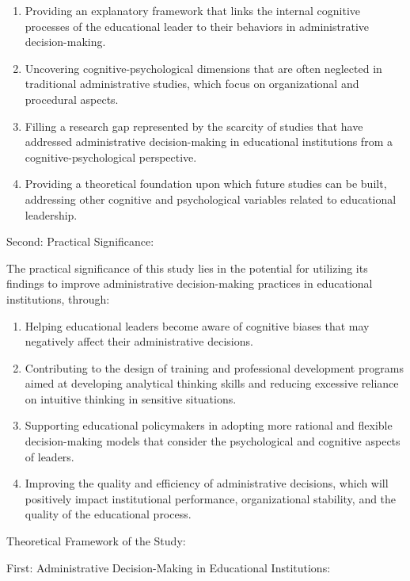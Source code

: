 \documentclass[10pt]{NSP1}
\begin{document}
\begin{enumerate}
  \item Providing an explanatory framework that links the internal cognitive processes of the educational leader to their behaviors in administrative decision-making.
  \item Uncovering cognitive-psychological dimensions that are often neglected in traditional administrative studies, which focus on organizational and procedural aspects.
  \item Filling a research gap represented by the scarcity of studies that have addressed administrative decision-making in educational institutions from a cognitive-psychological perspective.
  \item Providing a theoretical foundation upon which future studies can be built, addressing other cognitive and psychological variables related to educational leadership.
\end{enumerate}

Second: Practical Significance:

The practical significance of this study lies in the potential for utilizing its findings to improve administrative decision-making practices in educational institutions, through:

\begin{enumerate}
  \item Helping educational leaders become aware of cognitive biases that may negatively affect their administrative decisions.
  \item Contributing to the design of training and professional development programs aimed at developing analytical thinking skills and reducing excessive reliance on intuitive thinking in sensitive situations.
  \item Supporting educational policymakers in adopting more rational and flexible decision-making models that consider the psychological and cognitive aspects of leaders.
  \item Improving the quality and efficiency of administrative decisions, which will positively impact institutional performance, organizational stability, and the quality of the educational process.
\end{enumerate}

Theoretical Framework of the Study:

First: Administrative Decision-Making in Educational Institutions:

\par\medskip{}\smallskip
\end{document}
